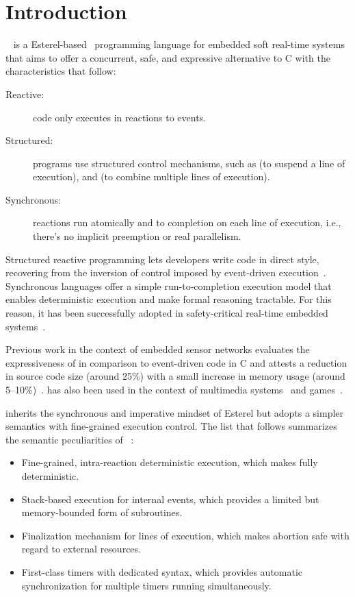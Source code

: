 \section{Introduction}
\label{sec.intro}

\CEU~\cite{ceu.sensys13,ceu.tecs17} is a Esterel-based~\cite{esterel.ieee91}
programming language for embedded soft real-time systems that aims to offer a
concurrent, safe, and expressive alternative to C with the characteristics that
follow:
%
\begin{description}
\item [Reactive:] code only executes in reactions to events.
\item [Structured:] programs use structured control mechanisms, such as
     (to suspend a line of execution), and  (to combine
    multiple lines of execution).
\item [Synchronous:] reactions run atomically and to completion on each line of
    execution, i.e., there's no implicit preemption or real parallelism.
\end{description}
%
Structured reactive programming lets developers write code in direct style,
recovering from the inversion of control imposed by event-driven
execution~\cite{rp.deprecating,rp.rescala,sync_async.cooperative}.
%
Synchronous languages offer a simple run-to-completion execution model that
enables deterministic execution and make formal reasoning tractable.
For this reason, it has been successfully adopted in safety-critical real-time
embedded systems~\cite{rp.twelve}.

Previous work in the context of embedded sensor networks evaluates the
expressiveness of \CEU in comparison to event-driven code in C and attests a
reduction in source code size (around 25\%) with a small increase in memory
usage (around 5--10\%)~\cite{ceu.sensys13}.
%
\CEU has also been used in the context of multimedia
systems~\cite{ceumedia.webmedia16} and games~\cite{ceu.mod15}.

\CEU inherits the synchronous and imperative mindset of Esterel but adopts a
simpler semantics with fine-grained execution control.
%
The list that follows summarizes the semantic peculiarities of
\CEU~\cite{ceu.tecs17}:
%
\begin{itemize}
    \item Fine-grained, intra-reaction deterministic execution, which makes
          \CEU fully deterministic.
    \item Stack-based execution for internal events, which provides a limited
          but memory-bounded form of subroutines.
    \item Finalization mechanism for lines of execution, which makes abortion
          safe with regard to external resources.
    \item First-class timers with dedicated syntax, which provides automatic
          synchronization for multiple timers running simultaneously.
\end{itemize}

